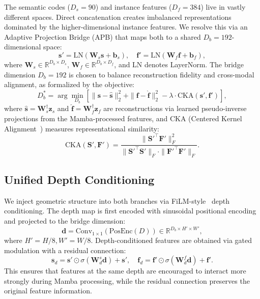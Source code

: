 \documentclass{article}
\begin{document}
The semantic codes ($D_s = 90$) and instance features ($D_f = 384$) live in vastly different spaces. Direct concatenation creates imbalanced representations dominated by the higher-dimensional instance features. We resolve this via an Adaptive Projection Bridge (APB) that maps both to a shared $D_b = 192$-dimensional space:
\begin{equation}
\mathbf{s}' = \text{LN}(\mathbf{W}_s \mathbf{s} + \mathbf{b}_s), \quad
\mathbf{f}' = \text{LN}(\mathbf{W}_f \mathbf{f} + \mathbf{b}_f),
\label{eq:projection}
\end{equation}
where $\mathbf{W}_s \in \mathbb{R}^{D_b \times D_s}$, $\mathbf{W}_f \in \mathbb{R}^{D_b \times D_f}$, and LN denotes LayerNorm. The bridge dimension $D_b = 192$ is chosen to balance reconstruction fidelity and cross-modal alignment, as formalized by the objective:
\begin{equation}
D_b^* = \arg\min_{D_b} \left[\|\mathbf{s} - \hat{\mathbf{s}}\|_2^2 + \|\mathbf{f} - \hat{\mathbf{f}}\|_2^2 - \lambda \cdot \text{CKA}(\mathbf{s}', \mathbf{f}')\right],
\label{eq:optimal_bridge}
\end{equation}
where $\hat{\mathbf{s}} = \mathbf{W}_s^\dagger \mathbf{z}_s$ and $\hat{\mathbf{f}} = \mathbf{W}_f^\dagger \mathbf{z}_f$ are reconstructions via learned pseudo-inverse projections from the Mamba-processed features, and CKA (Centered Kernel Alignment~\cite{kornblith2019cka}) measures representational similarity:
\begin{equation}
\text{CKA}(\mathbf{S}', \mathbf{F}') = \frac{\|\mathbf{S}'^{\!\top} \mathbf{F}'\|_F^2}{\|\mathbf{S}'^{\!\top} \mathbf{S}'\|_F \cdot \|\mathbf{F}'^{\!\top} \mathbf{F}'\|_F}.
\label{eq:cka}
\end{equation}


\subsection{Unified Depth Conditioning}
\label{sec:depth_cond}

We inject geometric structure into both branches via FiLM-style~\cite{perez2018film} depth conditioning. The depth map is first encoded with sinusoidal positional encoding and projected to the bridge dimension:
\begin{equation}
\mathbf{d} = \text{Conv}_{1 \times 1}(\text{PosEnc}(D)) \in \mathbb{R}^{D_b \times H' \times W'},
\end{equation}
where $H' = H/8, W' = W/8$. Depth-conditioned features are obtained via gated modulation with a residual connection:
\begin{equation}
\mathbf{s}_d = \mathbf{s}' \odot \sigma(\mathbf{W}_d^s \mathbf{d}) + \mathbf{s}', \quad
\mathbf{f}_d = \mathbf{f}' \odot \sigma(\mathbf{W}_d^f \mathbf{d}) + \mathbf{f}'.
\label{eq:film}
\end{equation}
This ensures that features at the same depth are encouraged to interact more strongly during Mamba processing, while the residual connection preserves the original feature information.
\end{document}
